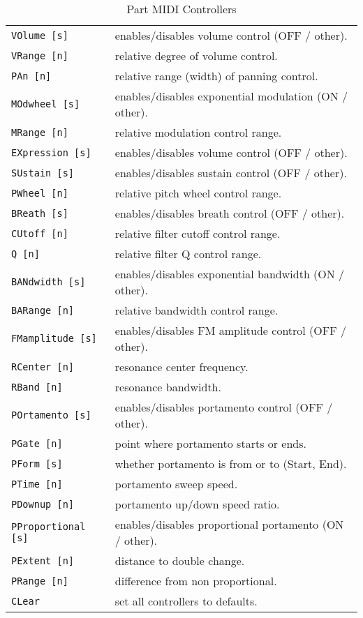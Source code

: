    \begin{table}[H]
      \centering
      \caption{Part MIDI Controllers}
      \label{table:yoshimi_part_midi_commands}
      \begin{tabular}{l l}
\texttt{VOlume [s]} &
   enables/disables volume control (OFF / other). \\
\texttt{VRange [n]} &
   relative degree of volume control. \\
\texttt{PAn [n]} &
   relative range (width) of panning control. \\
\texttt{MOdwheel [s]} &
   enables/disables exponential modulation (ON / other). \\
\texttt{MRange [n]} &
   relative modulation control range. \\
\texttt{EXpression [s]} &
   enables/disables volume control (OFF / other). \\
\texttt{SUstain [s]} &
   enables/disables sustain control (OFF / other). \\
\texttt{PWheel [n]} &
   relative pitch wheel control range. \\
\texttt{BReath [s]} &
   enables/disables breath control (OFF / other). \\
\texttt{CUtoff [n]} &
   relative filter cutoff control range. \\
\texttt{Q [n]} &
   relative filter Q control range. \\
\texttt{BANdwidth [s]} &
   enables/disables exponential bandwidth (ON / other). \\
\texttt{BARange [n]} &
   relative bandwidth control range. \\
\texttt{FMamplitude [s]} &
   enables/disables FM amplitude control (OFF / other). \\
\texttt{RCenter [n]} &
   resonance center frequency. \\
\texttt{RBand [n]} &
   resonance bandwidth. \\
\texttt{POrtamento [s]} &
   enables/disables portamento control (OFF / other). \\
\texttt{PGate [n]} &
   point where portamento starts or ends. \\
\texttt{PForm [s]} &
   whether portamento is from or to (Start, End). \\
\texttt{PTime [n]} &
   portamento sweep speed. \\
\texttt{PDownup [n]} &
   portamento up/down speed ratio. \\
\texttt{PProportional [s]} &
   enables/disables proportional portamento (ON / other). \\
\texttt{PExtent [n]} &
   distance to double change. \\
\texttt{PRange [n]} &
   difference from non proportional. \\
\texttt{CLear} &
   set all controllers to defaults. \\
      \end{tabular}
   \end{table}


